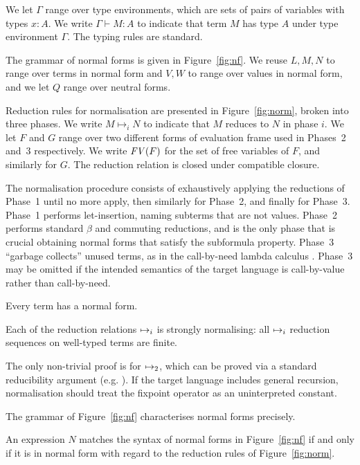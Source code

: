 We let $\Gamma$ range over type environments, which are sets of pairs
of variables with types $x:A$. We write $\Gamma \vdash M:A$ to
indicate that term $M$ has type $A$ under type environment
$\Gamma$. The typing rules are standard.

The grammar of normal forms is given in Figure~\ref{fig:nf}. We reuse
$L,M,N$ to range over terms in normal form and $V,W$ to range over
values in normal form, and we let $Q$ range over neutral forms.

Reduction rules for normalisation are presented in
Figure~\ref{fig:norm}, broken into three phases. We write $M
\mapsto_i N$ to indicate that $M$ reduces to $N$ in phase $i$. We let
$F$ and $G$ range over two different forms of evaluation frame used in
Phases~2 and~3 respectively. We write $\text{\textit{FV}}(F)$ for the set of free
variables of $F$, and similarly for $G$.
The reduction relation is closed under compatible closure.

\figterm
\fignf
\fignorm

The normalisation procedure consists of exhaustively applying
the reductions of Phase~1 until no more apply, then similarly for
Phase~2, and finally for Phase~3. Phase~1 performs let-insertion,
naming subterms that are not values.
Phase~2 performs standard $\beta$ and commuting reductions, and is the
only phase that is crucial obtaining normal forms that satisfy the
subformula property. Phase~3 ``garbage collects'' unused terms, as in
the call-by-need lambda calculus \citep{call-by-need}. Phase~3 may be
omitted if the intended semantics of the target language is
call-by-value rather than call-by-need.

Every term has a normal form.
\begin{proposition}
Each of the reduction relations $\mapsto_{i}$ is strongly
normalising: all $\mapsto_{i}$ reduction sequences on well-typed
terms are finite.
\end{proposition}
The only non-trivial proof is for $\mapsto_{2}$, which can be
proved via a standard reducibility argument
(e.g. \cite{Lindley07}). If the target language includes general
recursion, normalisation should treat the fixpoint operator as an
uninterpreted constant.

The grammar of Figure~\ref{fig:nf} characterises normal forms
precisely.
\begin{proposition}
\label{prop_normal}
An expression $N$ matches the syntax of normal forms in
Figure~\ref{fig:nf} if and only if it is in normal form with regard to
the reduction rules of Figure~\ref{fig:norm}.
\end{proposition}

